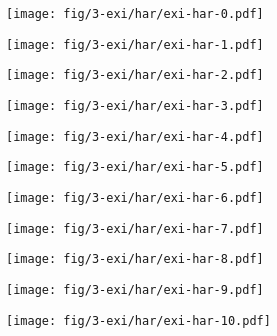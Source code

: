 \begin{frame}
\begin{columns}[t]
  \begin{column}{0.3\linewidth}
    {
      \begin{figure}[H]
        \centering
        \texttt{[image: fig/3-exi/har/exi-har-0.pdf]}
      \end{figure}
    }
    {
      \begin{figure}[H]
        \centering
        \texttt{[image: fig/3-exi/har/exi-har-1.pdf]}
      \end{figure}
    }
    {
      \begin{figure}[H]
        \centering
        \texttt{[image: fig/3-exi/har/exi-har-2.pdf]}
      \end{figure}
    }
    {
      \begin{figure}[H]
        \centering
        \texttt{[image: fig/3-exi/har/exi-har-3.pdf]}
      \end{figure}
    }
    {
      \begin{figure}[H]
        \centering
        \texttt{[image: fig/3-exi/har/exi-har-4.pdf]}
      \end{figure}
    }
    {
      \begin{figure}[H]
        \centering
        \texttt{[image: fig/3-exi/har/exi-har-5.pdf]}
      \end{figure}
    }
    {
      \begin{figure}[H]
        \centering
        \texttt{[image: fig/3-exi/har/exi-har-6.pdf]}
      \end{figure}
    }
    {
      \begin{figure}[H]
        \centering
        \texttt{[image: fig/3-exi/har/exi-har-7.pdf]}
      \end{figure}
    }
    {
      \begin{figure}[H]
        \centering
        \texttt{[image: fig/3-exi/har/exi-har-8.pdf]}
      \end{figure}
    }
    {
      \begin{figure}[H]
        \centering
        \texttt{[image: fig/3-exi/har/exi-har-9.pdf]}
      \end{figure}
    }
    {
      \begin{figure}[H]
        \centering
        \texttt{[image: fig/3-exi/har/exi-har-10.pdf]}
      \end{figure}
    }  
  \end{column}
\end{columns}
\end{frame}

